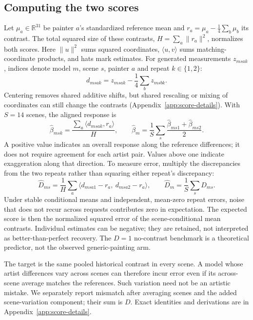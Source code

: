 \documentclass[11pt]{article}
\newcommand{\R}{\mathbb R}
\begin{document}
\subsection{Computing the two scores}
Let $\mu_a\in\R^{31}$ be painter $a$'s standardized reference mean and
$r_a=\mu_a-\frac14\sum_b\mu_b$ its contrast. The total squared size of these
contrasts, $H=\sum_a\|r_a\|^2$, normalizes both scores. Here $\|u\|^2$ sums squared
coordinates, $\langle u,v\rangle$ sums matching-coordinate products, and
hats mark estimates. For generated measurements $z_{msak}$, indices denote
model $m$, scene $s$, painter $a$ and repeat $k\in\{1,2\}$:
\begin{equation}
 d_{msak}=z_{msak}-\frac14\sum_b z_{msbk}.
 \label{eq:center}
\end{equation}
Centering removes shared additive shifts, but shared rescaling or mixing
of coordinates can still change the contrasts
(Appendix~\ref{app:score-details}). With $S=14$ scenes, the aligned response is
\begin{equation}
 \widehat\beta_{msk}=\frac{\sum_a\langle d_{msak},r_a\rangle}{H},\qquad
 \widehat\beta_m=\frac1S\sum_s\frac{\widehat\beta_{ms1}+\widehat\beta_{ms2}}2.
 \label{eq:beta}
\end{equation}
A positive value indicates an overall response along the reference differences;
it does not require agreement for each artist pair. Values above one indicate
exaggeration along that direction. To measure error, multiply the discrepancies
from the two repeats rather than squaring either repeat's discrepancy:
\begin{equation}
 \widehat D_{ms}=\frac1H\sum_a
 \langle d_{msa1}-r_a,\ d_{msa2}-r_a\rangle,\qquad
 \widehat D_m=\frac1S\sum_s\widehat D_{ms}.
 \label{eq:distortion}
\end{equation}
Under stable conditional means and independent, mean-zero repeat errors,
noise that does not recur across requests contributes zero in expectation.
The expected score is then the normalized squared error of the scene-conditional
mean contrasts. Individual estimates can be negative; they are retained, not
interpreted as better-than-perfect recovery. The $D=1$ no-contrast benchmark
is a theoretical predictor, not the observed generic-painting arm.

The target is the same pooled historical contrast in every scene. A model
whose artist differences vary across scenes can therefore incur error even
if its across-scene average matches the references. Such variation need not
be an artistic mistake. We separately report mismatch after averaging scenes
and the added scene-variation component; their sum is $D$. Exact identities
and derivations are in Appendix~\ref{app:score-details}.
\end{document}
